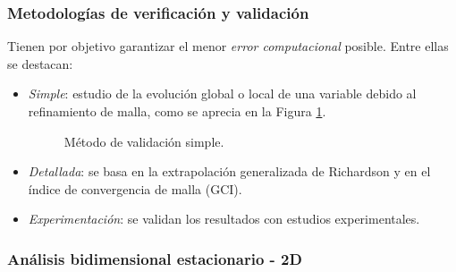 \subsubsection{Metodolog\'ias de verificaci\'on y validaci\'on} \label{verified}

\noindent
\justify

Tienen por objetivo garantizar el menor \textit{error computacional} posible. Entre ellas se destacan:

\begin{itemize}
	\item \textit{Simple}: estudio de la evoluci\'on global o local de una variable debido al refinamiento de malla, como se aprecia en la Figura \ref{valsimple}.
	\begin{figure}[h!]
	\centering
	\caption{M\'etodo de validaci\'on simple.}
	\label{valsimple}
	\end{figure}
	\item \textit{Detallada}: se basa en la extrapolaci\'on generalizada de Richardson y en el \'indice de convergencia de malla (GCI).
	\item \textit{Experimentaci\'on}: se validan los resultados con estudios experimentales.
\end{itemize}

\subsubsection{An\'alisis bidimensional estacionario - 2D} \label{CFD2D}

\noindent
\justify

